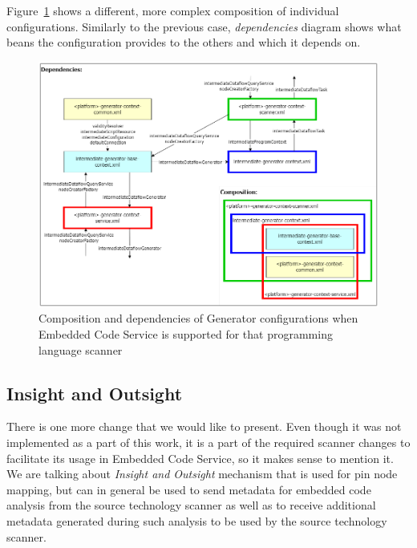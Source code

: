 \par
Figure~\ref{fig:generatorECS} shows a different, more complex composition of individual configurations. Similarly to the previous case, \textit{dependencies} diagram shows what beans the configuration provides to the others and which it depends on.
\begin{figure}[ht]\centering
\includegraphics[width=1.0\textwidth]{img/generator_ECS.png}
\caption{Composition and dependencies of Generator configurations when Embedded Code Service is supported for that programming language scanner}
\label{fig:generatorECS}
\end{figure}

\subsection{Insight and Outsight}
There is one more change that we would like to present. Even though it was not implemented as a part of this work, it is a part of the required scanner changes to facilitate its usage in Embedded Code Service, so it makes sense to mention it. We are talking about \textit {Insight and Outsight} mechanism that is used for pin node mapping, but can in general be used to send metadata for embedded code analysis from the source technology scanner as well as to receive additional metadata generated during such analysis to be used by the source technology scanner.

